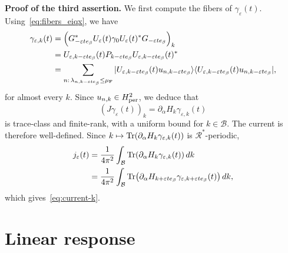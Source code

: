 \documentclass[a4paper,11pt]{article}
\theoremstyle{plain}
\theoremstyle{remark}
\def\eps{{\varepsilon}}
\def\cB{{\mathcal B}}
\def\cR{{\mathcal R}}
\begin{document}
\noindent
{\bf Proof of the third assertion.} We first compute the fibers of
$\gamma_\eps(t)$. Using~\eqref{eq:fibers_eiqx}, we have
\begin{align}
\gamma_{\eps,k}(t)
&=\left(G_{-\eps te_\beta}^*U_\eps(t)\gamma_0U_\eps(t)^*G_{-\eps te_\beta}\right)_k\\
&=U_{\eps,k-\eps te_\beta}(t)P_{k-\eps te_\beta}
 U_{\eps,k-\eps te_\beta}(t)^*\label{eq:gebkt}\\
&=\sum_{n:\,\lambda_{n,k-\eps te_\beta}\le\mu_{\rm F}}
 |U_{\eps,k-\eps te_\beta}(t)u_{n,k-\eps te_\beta}\rangle
 \langle U_{\eps,k-\eps te_\beta}(t)u_{n,k-\eps te_\beta}|,\nonumber
\end{align}
for almost every $k$. Since $u_{n,k}\in H^2_{\rm per}$, we deduce that
\[
(J\gamma_\eps(t))_k=\partial_\alpha H_k\gamma_{\eps,k}(t)
\]
is trace-class and finite-rank, with a uniform bound for $k\in\cB$.
The current is therefore well-defined. Since
$k\mapsto\Tr(\partial_\alpha H_k\gamma_{\eps,k}(t))$ is $\cR^*$-periodic,
\begin{align*}
j_\eps(t)
&=\frac1{4\pi^2}\int_\cB\Tr(\partial_\alpha H_k\gamma_{\eps,k}(t))\,dk\\
&=\frac1{4\pi^2}\int_\cB\Tr(\partial_\alpha H_{k+\eps te_\beta}
\gamma_{\eps,k+\eps te_\beta}(t))\,dk,
\end{align*}
which gives~\eqref{eq:current-k}.


\section{Linear response}\label{sec:linear-response}
\end{document}
